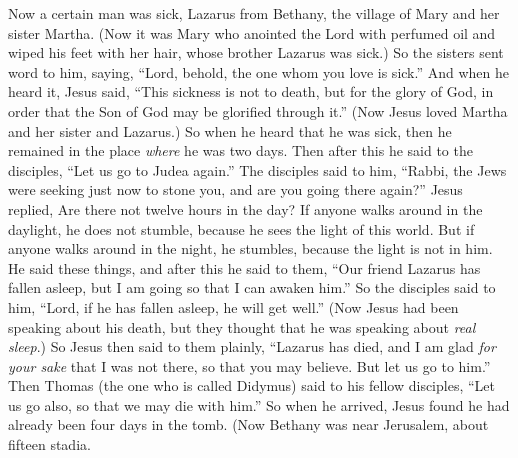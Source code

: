 \begin{biblechapter} %
 Now a certain man was sick, Lazarus from Bethany, the village of Mary and her sister Martha.
\verse (Now it was Mary who anointed the Lord with perfumed oil and wiped his feet with her hair, whose brother Lazarus was sick.)
\verse So the sisters sent word to him, saying, “Lord, behold, the one whom you love is sick.”
\verse And when he heard it, Jesus said, “This sickness is not to death, but for the glory of God, in order that the Son of God may be glorified through it.”
\verse (Now Jesus loved Martha and her sister and Lazarus.)
\verse So when he heard that he was sick, then he remained in the place \textit{where} he was two days.
\verse Then after this he said to the disciples, “Let us go to Judea again.”
\verse The disciples said to him, “Rabbi, the Jews were seeking just now to stone you, and are you going there again?”
\verse Jesus replied, Are there not twelve hours in the day? If anyone walks around in the daylight, he does not stumble, because he sees the light of this world.
\verse But if anyone walks around in the night, he stumbles, because the light is not in him.
\verse He said these things, and after this he said to them, “Our friend Lazarus has fallen asleep, but I am going so that I can awaken him.”
\verse So the disciples said to him, “Lord, if he has fallen asleep, he will get well.”
\verse (Now Jesus had been speaking about his death, but they thought that he was speaking about \textit{real sleep}.)
\verse So Jesus then said to them plainly, “Lazarus has died,
\verse and I am glad \textit{for your sake} that I was not there, so that you may believe. But let us go to him.”
\verse Then Thomas (the one who is called Didymus) said to his fellow disciples, “Let us go also, so that we may die with him.”
 So when he arrived, Jesus found he had already been four days in the tomb.
\verse (Now Bethany was near Jerusalem, about fifteen stadia.

\end{biblechapter}
